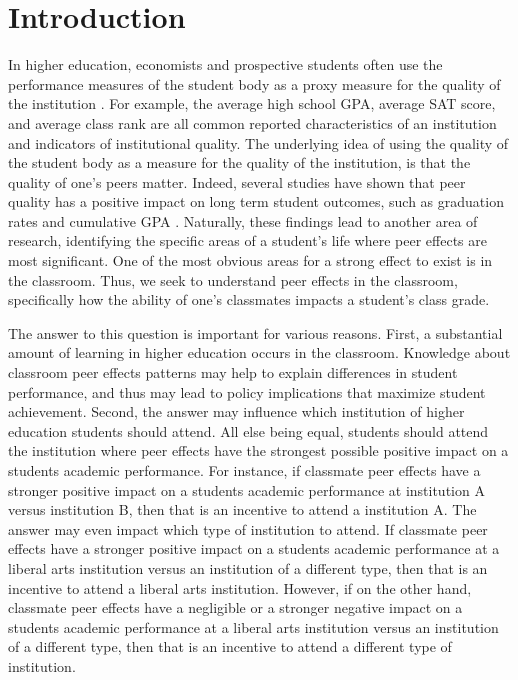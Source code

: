 \documentclass[12pt,letterpaper,english,fleqn]{article}
\date{March 2016}
\begin{document}

\doublespacing





\section{Introduction}\label{intro}

In higher education, economists and prospective students often use the performance measures of the student body as a proxy measure for the quality of the institution \citep{smith2015new,sarmiento2015quality,black2006estimating}.
For example, the average high school GPA, average SAT score, and average class rank are all common reported characteristics of an institution and indicators of institutional quality.
The underlying idea of using the quality of the student body as a measure for the quality of the institution, is that the quality of one's peers matter. 
Indeed, several studies have shown that peer quality has a positive impact on long term student outcomes, such as graduation rates and cumulative GPA \citep{smith2015new,luppino2015college,ost2010role}. 
Naturally, these findings lead to another area of research, identifying the specific areas of a student's life where peer effects are most significant. 
One of the most obvious areas for a strong effect to exist is in the classroom.
Thus, we seek to understand peer effects in the classroom, specifically how the ability of one's classmates impacts a student's class grade.

The answer to this question is important for various reasons. 
First, a substantial amount of learning in higher education occurs in the classroom. 
Knowledge about classroom peer effects patterns may help to explain differences in student performance, and thus may lead to policy implications that maximize student achievement. 
Second, the answer may influence which institution of higher education students should attend. 
All else being equal, students should attend the institution where peer effects have the strongest possible positive impact on a students academic performance. 
For instance, if classmate peer effects have a stronger positive impact on a students academic performance at institution A versus institution B, then that is an incentive to attend a institution A. 
The answer may even impact which type of institution to attend.
If classmate peer effects have a stronger positive impact on a students academic performance at a liberal arts institution versus an institution of a different type, then that is an incentive to attend a liberal arts institution. 
However, if on the other hand, classmate peer effects have a negligible or a stronger negative impact on a students academic performance at a liberal arts institution versus an institution of a different type, then that is an incentive to attend a different type of institution. 
\end{document}
